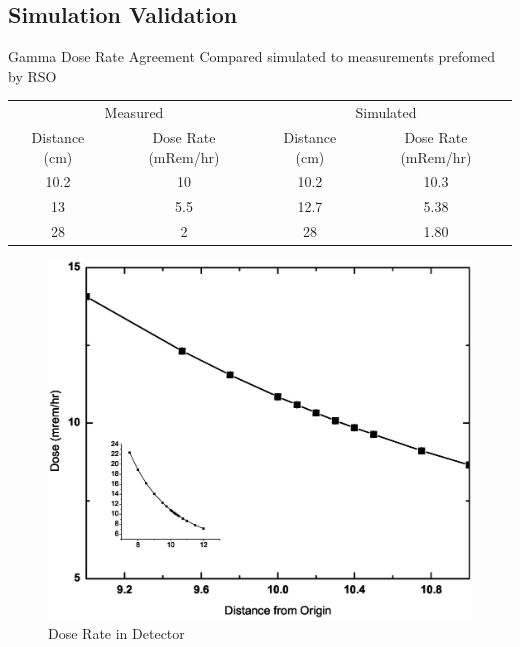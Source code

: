 \subsection{Simulation Validation}
\begin{frame}{Gamma Dose Rate Agreement}
\small
Compared simulated to measurements prefomed by RSO
	\begin{table}[h]
		\tiny
		\begin{tabular}{c c | c c}
        \multicolumn{2}{c}{Measured} & \multicolumn{2}{c}{Simulated} \\
        Distance (cm) & Dose Rate (mRem/hr) & Distance (cm) & Dose Rate (mRem/hr) \\
		\hline
		\hline
        10.2 & 10 & 10.2 & 10.3 \\
        13 & 5.5 & 12.7 & 5.38 \\
        28 & 2 & 28 & 1.80 \\
		\end{tabular}
	\end{table}
	\centering
	\begin{figure}
		\includegraphics[height=0.5\textheight]{images/DoseRate.eps}
		\caption{Dose Rate in Detector}
	\end{figure}
\end{frame}

